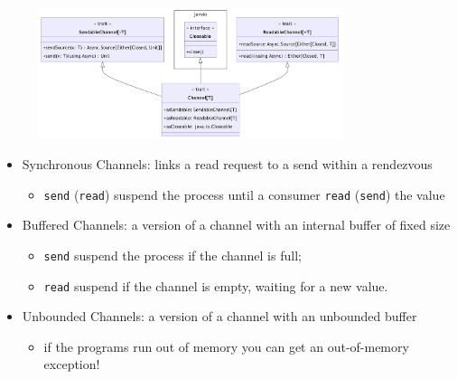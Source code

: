 \documentclass[aspectratio=1610,xcolor=dvipsnames]{beamer}
\begin{document}
\begin{frame}  
  \begin{figure}
    \centering
    \includegraphics[width=0.8\textwidth]{./images/channels-uml.png}
  \end{figure}
  \begin{itemize}
      \item Synchronous Channels: links a read request to a send within a rendezvous
      \begin{itemize}
          \item \texttt{send} (\texttt{read}) suspend the process until a consumer \texttt{read} (\texttt{send}) the value
      \end{itemize}
      \item Buffered Channels: a version of a channel with an internal buffer of fixed size
      \begin{itemize}
          \item \texttt{send} suspend the process if the channel is full;
          \item \texttt{read} suspend if the channel is empty, waiting for a new value.
      \end{itemize}
      \item Unbounded Channels: a version of a channel with an unbounded buffer
      \begin{itemize}
          \item if the programs run out of memory you can get an out-of-memory exception!
      \end{itemize}
  \end{itemize}
\end{frame}
%
\end{document}

